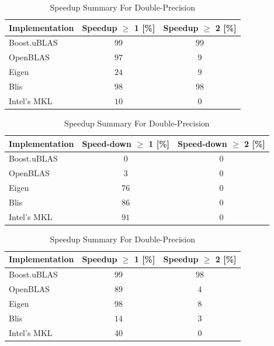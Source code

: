 \begin{table}[ht]
    \centering
    \caption{Speedup Summary For Single-Precision}
    \begin{tabular}{|l|c|c|}
        \hline
        \textbf{Implementation} & \textbf{Speedup $\geq$ 1 [\%]} & \textbf{Speedup $\geq$ 2 [\%]}\\
        \hline
        Boost.uBLAS & $99$ & $99$ \\
        \hline
        OpenBLAS    & $97$ & $9$ \\
        \hline
        Eigen       & $24$ & $9$ \\
        \hline
        Blis        & $98$ & $98$ \\
        \hline
        Intel's MKL & $10$ & $0$ \\
        \hline
    \end{tabular}
    
    \begin{tabular}{|l|c|c|}
        \hline
        \textbf{Implementation} & \textbf{Speed-down $\geq$ 1 [\%]} & \textbf{Speed-down $\geq$ 2 [\%]}\\
        \hline
        Boost.uBLAS & $0$ & $0$ \\
        \hline
        OpenBLAS    & $3$ & $0$ \\
        \hline
        Eigen       & $76$ & $0$ \\
        \hline
        Blis        & $86$ & $0$ \\
        \hline
        Intel's MKL & $91$ & $0$ \\
        \hline
    \end{tabular}
    
    \vspace*{1 cm}

    \centering
    \caption{Speedup Summary For Double-Precision}
    \begin{tabular}{|l|c|c|}
        \hline
        \textbf{Implementation} & \textbf{Speedup $\geq$ 1 [\%]} & \textbf{Speedup $\geq$ 2 [\%]}\\
        \hline
        Boost.uBLAS & $99$ & $98$ \\
        \hline
        OpenBLAS    & $89$ & $4$ \\
        \hline
        Eigen       & $98$ & $8$ \\
        \hline
        Blis        & $14$ & $3$ \\
        \hline
        Intel's MKL & $40$ & $0$ \\
        \hline
    \end{tabular}
    

\end{table}
